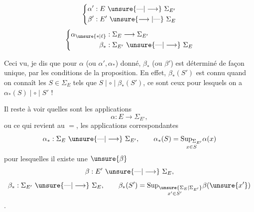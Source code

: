 
\[
\left\{\begin{aligned}
\alpha' &: E\ \unsure{\text{---}|\longrightarrow}\ \Sigma_{E'}\\
\beta' &: E'\ \unsure{\longrightarrow|\text{---}}\ \Sigma_E
\end{aligned}\right.
\]
\[
\left\{\begin{aligned}
\alpha_{\unsure{*|\ell}} &: \Sigma_E\longrightarrow\Sigma_{E'}\\
\beta_* &: \Sigma_{E'}\ \unsure{\text{---}|\longrightarrow}\ \Sigma_E
\end{aligned}\right.
\]

Ceci vu, je dis que  pour $\alpha$ (ou $\alpha',\alpha_*$) donné, $\beta_*$ (ou $\beta'$) est déterminé de façon unique, par les conditions de la proposition. En effet, $\beta_*(S')$ est connu quand on connaît les $S\in\Sigma_E$ tels que $S\mid\circ\mid\beta_*(S')$, ce sont ceux pour lesquels on a $\alpha_*(S)\mid\circ\mid S'$ !


Il reste à voir quelles sont les applications
\[
\alpha:E\longrightarrow\Sigma_{E'},
\]
ou ce qui revient au $=$, les applications correspondantes
\[
\alpha_*:\Sigma_E\ \unsure{\text{---}|\longrightarrow}\ \Sigma_{E'},\qquad \alpha_*(S)=\underset{x\in S}{\operatorname{Sup}_{\Sigma_{E'}}}\alpha(x)
\]
pour lesquelles il existe une $\unsure{\beta}$
\[
\beta:E'\ \unsure{\text{---}|\longrightarrow}\ \Sigma_E,
\]
\[
\beta_*:\Sigma_{E'}\ \unsure{\text{---}|\longrightarrow}\ \Sigma_E,\qquad \beta_*(S')=\underset{x'\in S'}{\operatorname{Sup}_{\unsure{\Sigma_E|\Sigma_{E'}}}}\beta(\unsure{x'})
\]
.

